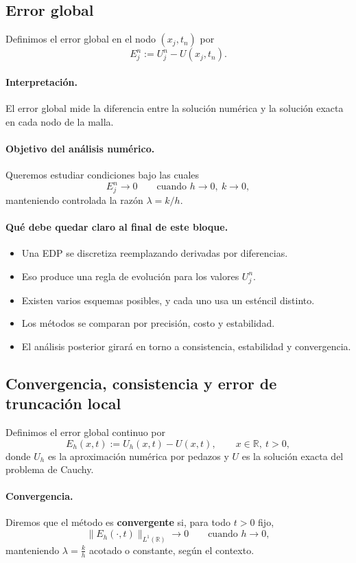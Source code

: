\subsection{Error global}

Definimos el error global en el nodo \((x_j,t_n)\) por
\[
E_j^n := U_j^n - U(x_j,t_n).
\]

\paragraph{Interpretación.}
El error global mide la diferencia entre la solución numérica y la solución exacta en cada nodo de la malla.

\paragraph{Objetivo del análisis numérico.}
Queremos estudiar condiciones bajo las cuales
\[
E_j^n \to 0
\qquad \text{cuando } h\to 0,\ k\to 0,
\]
manteniendo controlada la razón \(\lambda = k/h\).

\paragraph{Qué debe quedar claro al final de este bloque.}
\begin{itemize}
    \item Una EDP se discretiza reemplazando derivadas por diferencias.
    \item Eso produce una regla de evolución para los valores \(U_j^n\).
    \item Existen varios esquemas posibles, y cada uno usa un esténcil distinto.
    \item Los métodos se comparan por precisión, costo y estabilidad.
    \item El análisis posterior girará en torno a consistencia, estabilidad y convergencia.
\end{itemize}


\subsection{Convergencia, consistencia y error de truncación local}

Definimos el error global continuo por
\[
E_h(x,t):=U_h(x,t)-U(x,t),
\qquad x\in\mathbb{R},\ t>0,
\]
donde \(U_h\) es la aproximación numérica por pedazos y \(U\) es la solución exacta del problema de Cauchy.

\paragraph{Convergencia.}
Diremos que el método es \textbf{convergente} si, para todo \(t>0\) fijo,
\[
\|E_h(\cdot,t)\|_{L^1(\mathbb{R})}\longrightarrow 0
\qquad \text{cuando } h\to 0,
\]
manteniendo \(\lambda=\frac{k}{h}\) acotado o constante, según el contexto.

